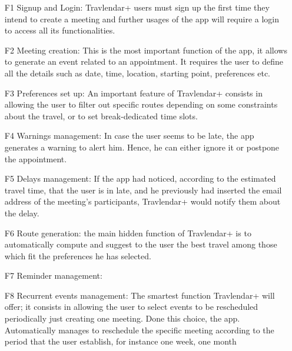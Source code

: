 
\begin{itemize}

\item[F1] Signup and Login: Travlendar+ users must sign up the first time they intend to create a meeting and further usages of the app will require a login to access all its functionalities.
\item[F2] Meeting creation: This is the most important function of the app, it allows to generate an event related to an appointment. It requires the user to define all the details such as date, time, location, starting point, preferences etc. 
\item[F3] Preferences set up: An important feature of Travlendar+ consists in allowing the user to filter out specific routes depending on some constraints about the travel, or to set break-dedicated time slots.
\item[F4] Warnings management: In case the user seems to be late, the app generates a warning to alert him. Hence, he can either ignore it or postpone the appointment.
\item[F5] Delays management:  If the app had noticed, according to the estimated travel time, that the user is in late, and he previously had inserted the email address of the meeting’s participants, Travlendar+ would notify them about the delay. 
\item[F6] Route generation: the main hidden function of Travlendar+ is to automatically compute and suggest to the user the best travel among those which fit the preferences he has selected.
\item[F7] Reminder management:

\item[F8] Recurrent events management: The smartest function Travlendar+ will offer; it consists in allowing the user to select events to be rescheduled periodically just creating one meeting. Done this choice, the app. Automatically manages to  reschedule the specific meeting according to the period that the user establish, for instance one week, one month
 


\end{itemize}

 
